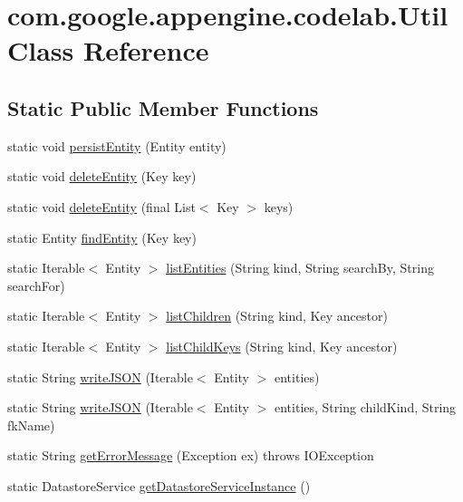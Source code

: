 \hypertarget{classcom_1_1google_1_1appengine_1_1codelab_1_1_util}{\section{com.\-google.\-appengine.\-codelab.\-Util Class Reference}
\label{classcom_1_1google_1_1appengine_1_1codelab_1_1_util}
}
\subsection*{Static Public Member Functions}
\begin{DoxyCompactItemize}
\item 
static void \hyperlink{classcom_1_1google_1_1appengine_1_1codelab_1_1_util_a95f645b216766041423363dd06815dc7}{persist\-Entity} (Entity entity)
\item 
static void \hyperlink{classcom_1_1google_1_1appengine_1_1codelab_1_1_util_a04a02f078a3bd61f4bb36b48b4580c58}{delete\-Entity} (Key key)
\item 
static void \hyperlink{classcom_1_1google_1_1appengine_1_1codelab_1_1_util_ad219fba4ce05c825c31252a07a987f20}{delete\-Entity} (final List$<$ Key $>$ keys)
\item 
static Entity \hyperlink{classcom_1_1google_1_1appengine_1_1codelab_1_1_util_a14548b6d0d079225ae5f6596542a1c0f}{find\-Entity} (Key key)
\item 
static Iterable$<$ Entity $>$ \hyperlink{classcom_1_1google_1_1appengine_1_1codelab_1_1_util_a450bc0facf36bb5525b4f66a18be74cd}{list\-Entities} (String kind, String search\-By, String search\-For)
\item 
static Iterable$<$ Entity $>$ \hyperlink{classcom_1_1google_1_1appengine_1_1codelab_1_1_util_a7a9f221fa79d46f397b81e06820beb03}{list\-Children} (String kind, Key ancestor)
\item 
static Iterable$<$ Entity $>$ \hyperlink{classcom_1_1google_1_1appengine_1_1codelab_1_1_util_a3aa977c9e242b761d98ef6bcd9b55793}{list\-Child\-Keys} (String kind, Key ancestor)
\item 
static String \hyperlink{classcom_1_1google_1_1appengine_1_1codelab_1_1_util_a87d0f3bedf24d631c476ca62d10fb8d9}{write\-J\-S\-O\-N} (Iterable$<$ Entity $>$ entities)
\item 
static String \hyperlink{classcom_1_1google_1_1appengine_1_1codelab_1_1_util_a1166a7fd8ba0cbbd491a3aa68556bf1d}{write\-J\-S\-O\-N} (Iterable$<$ Entity $>$ entities, String child\-Kind, String fk\-Name)
\item 
static String \hyperlink{classcom_1_1google_1_1appengine_1_1codelab_1_1_util_a0d7e9492450f9aaaaf6b8b4e8a9d7890}{get\-Error\-Message} (Exception ex)  throws I\-O\-Exception
\item 
static Datastore\-Service \hyperlink{classcom_1_1google_1_1appengine_1_1codelab_1_1_util_a097d93268afc438617bd7e13f0f0f5e7}{get\-Datastore\-Service\-Instance} ()
\end{DoxyCompactItemize}


